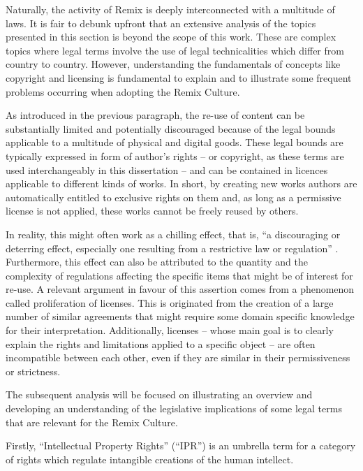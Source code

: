 Naturally, the activity of Remix is deeply interconnected with a multitude of laws. It is fair to debunk upfront that an extensive analysis of the topics presented in this section is beyond the scope of this work.  These are complex topics where legal terms involve the use of legal technicalities which differ from country to country. However, understanding the fundamentals of concepts like copyright and licensing is fundamental to explain and to illustrate some frequent problems occurring when adopting the Remix Culture.

As introduced in the previous paragraph, the re-use of content can be substantially limited and potentially discouraged because of the legal bounds applicable to a multitude of physical and digital goods. These legal bounds are typically expressed in form of author’s rights – or copyright, as these terms are used interchangeably in this dissertation – and can be contained in licences applicable to different kinds of works. In short, by creating new works authors are automatically entitled to exclusive rights on them and, as long as a permissive license is not applied, these works cannot be freely reused by others.

In reality, this might often work as a chilling effect, that is, “a discouraging or deterring effect, especially one resulting from a restrictive law or regulation” . Furthermore, this effect can also be attributed to the quantity and the complexity of regulations affecting the specific items that might be of interest for re-use. A relevant argument in favour of this assertion comes from a phenomenon called proliferation of licenses. This is originated from the creation of a large number of similar agreements that might require some domain specific knowledge for their interpretation. Additionally, licenses – whose main goal is to clearly explain the rights and limitations applied to a specific object – are often incompatible between each other, even if they are similar in their permissiveness or strictness.

The subsequent analysis will be focused on illustrating an overview and developing an understanding of the legislative implications of some legal terms that are relevant for the Remix Culture.

Firstly, “Intellectual Property Rights” (“IPR”) is an umbrella term for a category of rights which regulate intangible creations of the human intellect.

